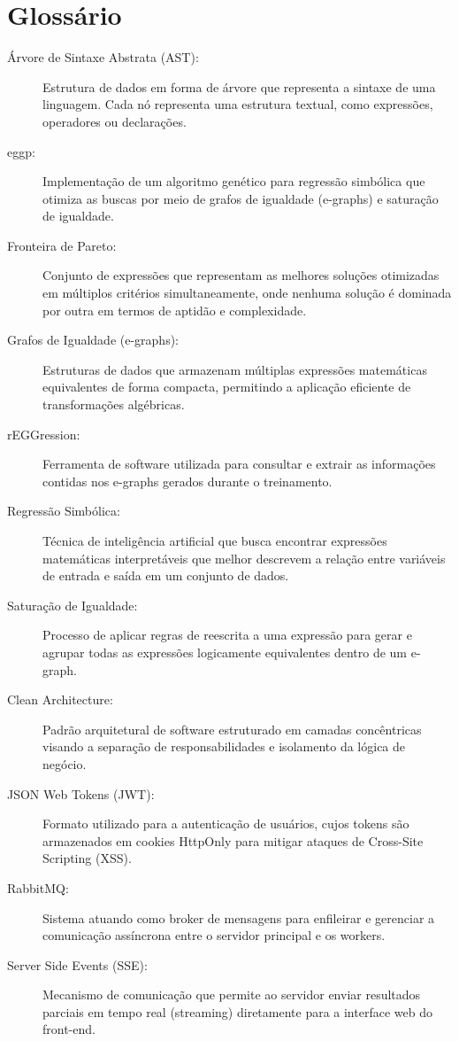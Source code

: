 \chapter{Glossário}
\label{chap:glossary}

\begin{description}
    \item[Árvore de Sintaxe Abstrata (AST):] Estrutura de dados em forma de árvore que representa a sintaxe de uma linguagem. Cada nó representa uma estrutura textual, como expressões, operadores ou declarações.
    \item[eggp:] Implementação de um algoritmo genético para regressão simbólica que otimiza as buscas por meio de grafos de igualdade (e-graphs) e saturação de igualdade.
    \item[Fronteira de Pareto:] Conjunto de expressões que representam as melhores soluções otimizadas em múltiplos critérios simultaneamente, onde nenhuma solução é dominada por outra em termos de aptidão e complexidade.
    \item[Grafos de Igualdade (e-graphs):] Estruturas de dados que armazenam múltiplas expressões matemáticas equivalentes de forma compacta, permitindo a aplicação eficiente de transformações algébricas.
    \item[rEGGression:] Ferramenta de software utilizada para consultar e extrair as informações contidas nos e-graphs gerados durante o treinamento.
    \item[Regressão Simbólica:] Técnica de inteligência artificial que busca encontrar expressões matemáticas interpretáveis que melhor descrevem a relação entre variáveis de entrada e saída em um conjunto de dados.
    \item[Saturação de Igualdade:] Processo de aplicar regras de reescrita a uma expressão para gerar e agrupar todas as expressões logicamente equivalentes dentro de um e-graph.
    \item[Clean Architecture:] Padrão arquitetural de software estruturado em camadas concêntricas visando a separação de responsabilidades e isolamento da lógica de negócio.
    \item[JSON Web Tokens (JWT):] Formato utilizado para a autenticação de usuários, cujos tokens são armazenados em cookies HttpOnly para mitigar ataques de Cross-Site Scripting (XSS).
    \item[RabbitMQ:] Sistema atuando como broker de mensagens para enfileirar e gerenciar a comunicação assíncrona entre o servidor principal e os workers.
    \item[Server Side Events (SSE):] Mecanismo de comunicação que permite ao servidor enviar resultados parciais em tempo real (streaming) diretamente para a interface web do front-end.

\end{description}
